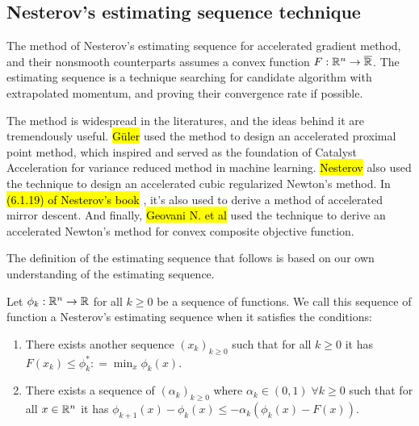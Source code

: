 \documentclass[12pt]{article}
\begin{document}
    \subsection{Nesterov's estimating sequence technique}
        The method of Nesterov's estimating sequence for accelerated gradient method, and their nonsmooth counterparts assumes a convex function $F: \mathbb R^n \rightarrow \overline{\mathbb R}$. 
        The estimating sequence is a technique searching for candidate algorithm with extrapolated momentum, and proving their convergence rate if possible. 
        \par
        The method is widespread in the literatures, and the ideas behind it are tremendously useful. 
        {\hl{Güler}} \cite{guler_new_1992}
        used the method to design an accelerated proximal point method, which inspired and served as the foundation of Catalyst Acceleration for variance reduced method in machine learning. 
        {\hl{Nesterov}} \cite{nesterov_accelerating_2008}
        also used the technique to design an accelerated cubic regularized Newton's method. 
        In 
        \hl{(6.1.19) of Nesterov's book }\cite{nesterov_lectures_2018}, 
        it's also used to derive a method of accelerated mirror descent. 
        And finally, 
        {\hl{Geovani N. et al}} \cite{grapiglia_accelerated_2019}
        used the technique to derive an accelerated Newton's method for convex composite objective function. 
        \par
        The definition of the estimating sequence that follows is based on our own understanding of the estimating sequence. 
        \begin{definition}\label{def:nes-est-seq}
            Let $\phi_k : \mathbb R^n \rightarrow\mathbb R$ for all $k \ge 0$ be a sequence of functions. 
            We call this sequence of function a Nesterov's estimating sequence when it satisfies the conditions: 
            \begin{enumerate}
                \item There exists another sequence $(x_k)_{k \ge 0}$ such that for all $k \ge 0$ it has $F(x_k) \le \phi_k^*: =\min_{x}\phi_k(x)$. 
                \item There exists a sequence of $(\alpha_k)_{k \ge 0}$ where $\alpha_k \in (0, 1)\; \forall k \ge0 $ such that for all $x \in \mathbb R^n$ it has $\phi_{k + 1}(x) - \phi_k(x) \le - \alpha_k(\phi_k(x) - F(x))$. 
            \end{enumerate}
        \end{definition}
\end{document}
